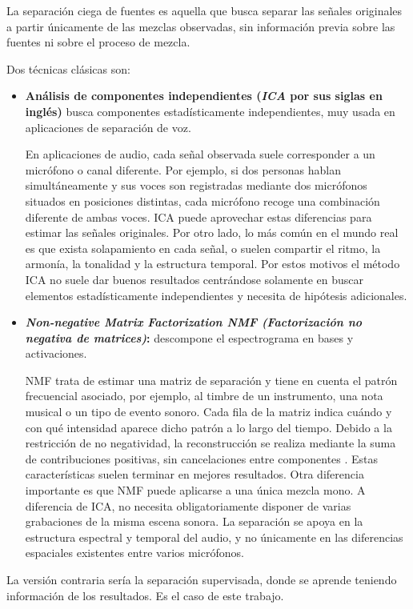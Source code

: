 La separación ciega de fuentes es aquella que busca separar las señales originales a partir únicamente de las mezclas observadas, sin información previa sobre las fuentes ni sobre el proceso de mezcla.\cite{cardoso1998blind}

Dos técnicas clásicas son:
\begin{itemize}
    \item \textbf{Análisis de componentes independientes (\textit{ICA} por sus siglas en inglés)} busca componentes estadísticamente independientes, muy usada en aplicaciones de separación de voz.
    
    En aplicaciones de audio, cada señal observada suele corresponder a un micrófono o canal diferente. Por ejemplo, si dos personas hablan simultáneamente y sus voces son registradas mediante dos micrófonos situados en posiciones distintas, cada micrófono recoge una combinación diferente de ambas voces. ICA puede aprovechar estas diferencias para estimar las señales originales.
    Por otro lado, lo más común en el mundo real es que exista solapamiento en cada señal, o suelen compartir el ritmo, la armonía, la tonalidad y la estructura temporal. Por estos motivos el método ICA no suele dar buenos resultados centrándose solamente en buscar elementos estadísticamente independientes y necesita de hipótesis adicionales.

    \item \textbf{\textit{Non-negative Matrix Factorization NMF (Factorización no negativa de matrices)}:} descompone el espectrograma en bases y activaciones.
    
    NMF trata de estimar una matriz de separación y tiene en cuenta el patrón frecuencial asociado, por ejemplo, al timbre de un instrumento, una nota musical o un tipo de evento sonoro. Cada fila de la matriz indica cuándo y con qué intensidad aparece dicho patrón a lo largo del tiempo. 
    Debido a la restricción de no negatividad, la reconstrucción se realiza mediante la suma de contribuciones positivas, sin cancelaciones entre componentes \cite{lee1999learning}. Estas características suelen terminar en mejores resultados.
    Otra diferencia importante es que NMF puede aplicarse a una única mezcla mono. A diferencia de ICA, no necesita obligatoriamente disponer de varias grabaciones de la misma escena sonora. La separación se apoya en la estructura espectral y temporal del audio, y no únicamente en las diferencias espaciales existentes entre varios micrófonos.

\end{itemize}

La versión contraria sería la separación supervisada, donde se aprende teniendo información de los resultados. Es el caso de este trabajo.





